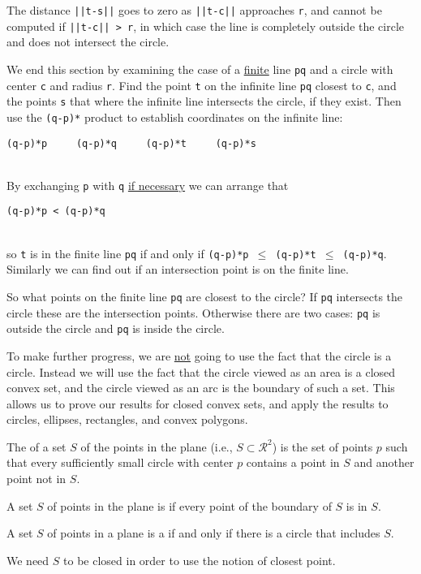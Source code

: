 \documentclass[12pt]{article}
\begin{document}
The distance {\tt ||t-s||} goes to zero as {\tt ||t-c||} approaches
{\tt r}, and cannot be computed if {\tt ||t-c|| > r}, in which case
the line is completely outside the circle and does not intersect the
circle.

We end this section by examining the case of a \underline{finite}
line {\tt pq} and a circle with center {\tt c} and radius {\tt r}.
Find the point {\tt t} on the infinite line {\tt pq} closest to
{\tt c}, and the points {\tt s} that where the infinite line intersects
the circle, if they exist.
Then use the {\tt (q-p)*} product to establish coordinates on the
infinite line: \\
\centerline{\tt (q-p)*p ~~~ (q-p)*q ~~~ (q-p)*t ~~~ (q-p)*s} \\
By exchanging {\tt p} with {\tt q}
\underline{if necessary} we can arrange that \\
\centerline{\tt (q-p)*p < (q-p)*q} \\
so {\tt t} is in the finite line {\tt pq} if and only if
{\tt (q-p)*p $\leq$ (q-p)*t $\leq$ (q-p)*q}.
Similarly we can find out if an intersection point is on the finite
line.

So what points on the finite line {\tt pq} are closest to the circle?
If {\tt pq} intersects the circle these are the intersection points.
Otherwise there are two cases: {\tt pq} is outside the circle and
{\tt pq} is inside the circle.

To make further progress, we are \underline{not} going to use the fact that the
circle is a circle.
Instead we will use the fact that the circle viewed
as an area is a closed convex set, and the circle viewed as an arc
is the boundary of such a set.  This allows us to prove our results
for closed convex sets, and apply the results to circles, ellipses,
rectangles, and convex polygons.

\begin{definition}
The  of a set $S$ of the points in the plane
(i.e., $S\subset\mathcal{R}^2$) is the
set of points $p$ such that every sufficiently small circle with
center $p$ contains a point in $S$ and another point not in $S$.

A set $S$ of points in the plane is  if every point
of the boundary of $S$ is in $S$.

A set $S$ of points in a plane is a  if and only if
there is a circle that includes $S$.
\end{definition}

We need $S$ to be closed in order to use the notion of
closest point.
\end{document}
